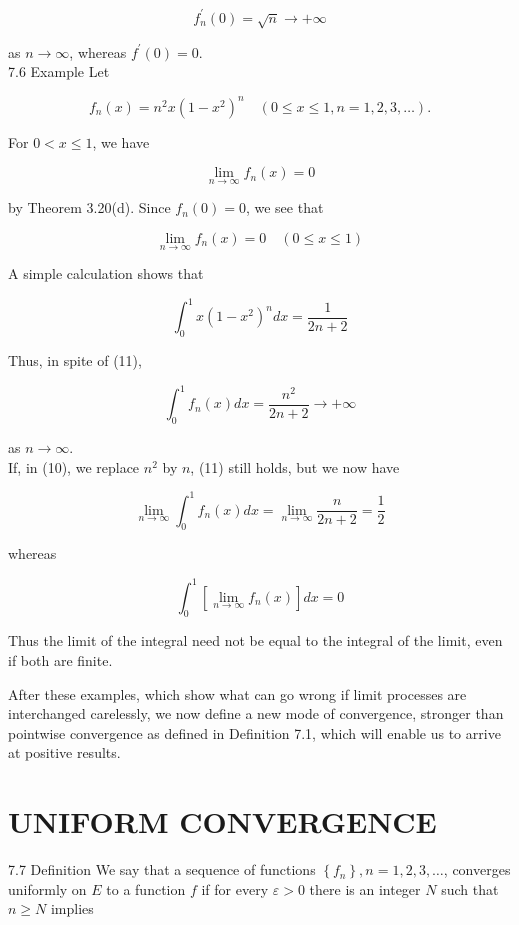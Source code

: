 \documentclass[10pt]{article}
\begin{document}
$$
f_{n}^{\prime}(0)=\sqrt{n} \rightarrow+\infty
$$

as $n \rightarrow \infty$, whereas $f^{\prime}(0)=0$.\\
7.6 Example Let


\begin{equation*}
f_{n}(x)=n^{2} x\left(1-x^{2}\right)^{n} \quad(0 \leq x \leq 1, n=1,2,3, \ldots) . \tag{10}
\end{equation*}


For $0<x \leq 1$, we have

$$
\lim _{n \rightarrow \infty} f_{n}(x)=0
$$

by Theorem 3.20(d). Since $f_{n}(0)=0$, we see that


\begin{equation*}
\lim _{n \rightarrow \infty} f_{n}(x)=0 \quad(0 \leq x \leq 1) \tag{11}
\end{equation*}


A simple calculation shows that

$$
\int_{0}^{1} x\left(1-x^{2}\right)^{n} d x=\frac{1}{2 n+2}
$$

Thus, in spite of (11),

$$
\int_{0}^{1} f_{n}(x) d x=\frac{n^{2}}{2 n+2} \rightarrow+\infty
$$

as $n \rightarrow \infty$.\\
If, in (10), we replace $n^{2}$ by $n$, (11) still holds, but we now have

$$
\lim _{n \rightarrow \infty} \int_{0}^{1} f_{n}(x) d x=\lim _{n \rightarrow \infty} \frac{n}{2 n+2}=\frac{1}{2}
$$

whereas

$$
\int_{0}^{1}\left[\lim _{n \rightarrow \infty} f_{n}(x)\right] d x=0
$$

Thus the limit of the integral need not be equal to the integral of the limit, even if both are finite.

After these examples, which show what can go wrong if limit processes are interchanged carelessly, we now define a new mode of convergence, stronger than pointwise convergence as defined in Definition 7.1, which will enable us to arrive at positive results.

\section*{UNIFORM CONVERGENCE}
7.7 Definition We say that a sequence of functions $\left\{f_{n}\right\}, n=1,2,3, \ldots$, converges uniformly on $E$ to a function $f$ if for every $\varepsilon>0$ there is an integer $N$ such that $n \geq N$ implies
\end{document}
